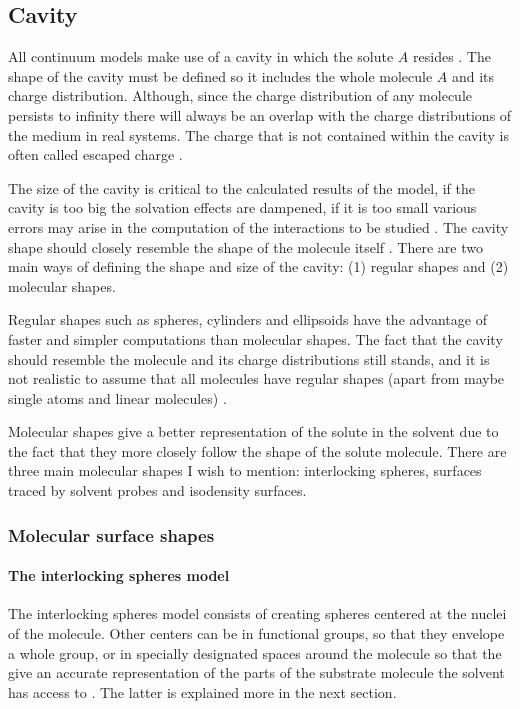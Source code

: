 \documentclass[../Thesis.tex]{subfiles}
\begin{document}
\subsection{Cavity}\label{Cavitytitle}
All continuum models make use of a cavity in which the solute $A$ resides
\cite{Tomasi:1994wt, Cramer:2004, Tomasi:2005ipa}. The shape of the cavity
must be defined so it includes the whole molecule $A$ and its charge distribution.
Although, since the charge distribution of any molecule persists to infinity there
will always be an overlap with the charge distributions of the medium in real
systems. The charge that is not contained within the cavity is often called
escaped charge \cite{Tomasi:2005ipa}.

The size of the cavity is critical to the calculated results of the model, if
the cavity is too big the solvation effects are dampened, if it is too small
various errors may arise in the computation of the interactions to be studied
\cite{Tomasi:1994wt}. The cavity shape should closely
resemble the shape of the molecule itself \cite{Tomasi:2005ipa}. There are two
main ways of defining the shape and size of the cavity: (1) regular
shapes and (2) molecular shapes.

Regular shapes such as spheres, cylinders and ellipsoids have the advantage of
faster and simpler computations than molecular shapes. The fact that the cavity
should resemble the molecule and its charge distributions still stands, and it
is not realistic to assume that all molecules have regular shapes (apart from
maybe single atoms and linear molecules) \cite{Tomasi:2005ipa}.

Molecular shapes give a better representation of the solute in the solvent due
to the fact that they more closely follow the shape of the solute molecule.
There are three main molecular shapes I wish to mention:
interlocking spheres, surfaces traced by solvent probes and isodensity surfaces.

\subsubsection{Molecular surface shapes}

\paragraph{The interlocking spheres model}
The interlocking spheres model consists of creating spheres centered at the nuclei
of the molecule. Other centers can be in functional groups, so that they envelope a whole group,
or in specially designated spaces around the molecule so that the give an accurate
representation of the parts of the substrate molecule the solvent has access to
\cite{Tomasi:1994wt}. The latter is explained more in the next section.
\end{document}
